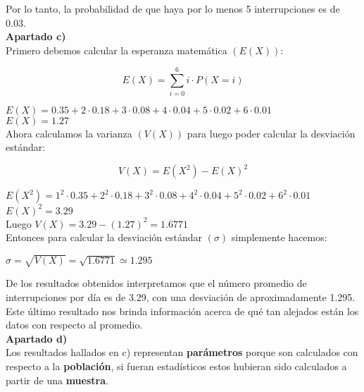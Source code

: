 \documentclass[11pt]{article}
\begin{document}
Por lo tanto, la probabilidad de que haya por lo menos 5 interrupciones es de 0.03. \\


\textbf{Apartado c)} \\

Primero debemos calcular la esperanza matemática $ (E(X)) $:

\[ E(X) = \sum_{i=0}^{6} i \cdot P(X = i) \]

$ E(X) = 0.35 + 2 \cdot 0.18 + 3 \cdot 0.08 + 4 \cdot 0.04 + 5 \cdot 0.02 + 6 \cdot 0.01 $ \\
$ E(X) = 1.27 $ \\

Ahora calculamos la varianza $ (V(X)) $ para luego poder calcular la desviación estándar:

\[  V(X) = E(X^{2}) - E(X)^{2} \]

$ E(X^{2}) = 1^2 \cdot 0.35 + 2^2 \cdot 0.18 + 3^2 \cdot 0.08 + 4^2 \cdot 0.04 + 5^2 \cdot 0.02 + 6^2 \cdot 0.01 $ \\
$ E(X)^2 = 3.29 $ \\

Luego $ V(X) = 3.29 - (1.27)^2 = 1.6771 $ \\

Entonces para calcular la desviación estándar $ (\sigma) $ simplemente hacemos:

\begin{center}
  $ \sigma = \sqrt{V(X)} = \sqrt{1.6771} \simeq 1.295 $
\end{center}

De los resultados obtenidos interpretamos que el número promedio de interrupciones
por día es de 3.29, con una desviación de aproximadamente 1.295. Este último resultado
nos brinda información acerca de qué tan alejados están los datos con respecto al
promedio. \\


\textbf{Apartado d)} \\

Los resultados hallados en c) representan \textbf{parámetros} porque son calculados con respecto
a la \textbf{población}, si fueran estadísticos estos hubieran sido
calculados a partir de una \textbf{muestra}.

\end{document}
